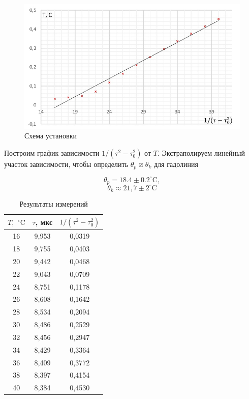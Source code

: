 \documentclass[a4paper]{article}
\theoremstyle{definition}
\theoremstyle{remark}
\begin{document}
\begin{figure}[h!]
    \centering
    \includegraphics[width=\linewidth]{image/pic1.jpg}
    \caption{Схема установки}
\end{figure}

Построим график зависимости $1 / (\tau^2 - \tau_0^2)$ от $T$. Экстраполируем линейный участок зависимости, чтобы определить $\theta_p$ и $\theta_k$ для гадолиния

    $$\theta_p = 18.4 \pm  0.2^{\circ} \mathrm{C},$$
    $$\theta_k \approx 21,7 \pm 2^{\circ} \mathrm{C}$$

\begin{table}[h!]
    \centering
    \caption{Результаты измерений}
    \begin{tabular}{|c|c|c|}
    \hline
    $T,$ $^\circ \mathrm{C}$ & $\tau$, мкс & $1/(\tau^2 - \tau_0^2)$ \\ \hline
    16             & 9,953       & 0,0319                  \\ \hline
    18             & 9,755       & 0,0403                  \\ \hline
    20             & 9,442       & 0,0468                  \\ \hline
    22             & 9,043       & 0,0709                  \\ \hline
    24             & 8,751       & 0,1178                  \\ \hline
    26             & 8,608       & 0,1642                  \\ \hline
    28             & 8,534       & 0,2094                  \\ \hline
    30             & 8,486       & 0,2529                  \\ \hline
    32             & 8,456       & 0,2947                  \\ \hline
    34             & 8,429       & 0,3364                  \\ \hline
    36             & 8,409       & 0,3772                  \\ \hline
    38             & 8,397       & 0,4154                  \\ \hline
    40             & 8,384       & 0,4530                  \\ \hline
    \end{tabular}
    \end{table}
\end{document}
